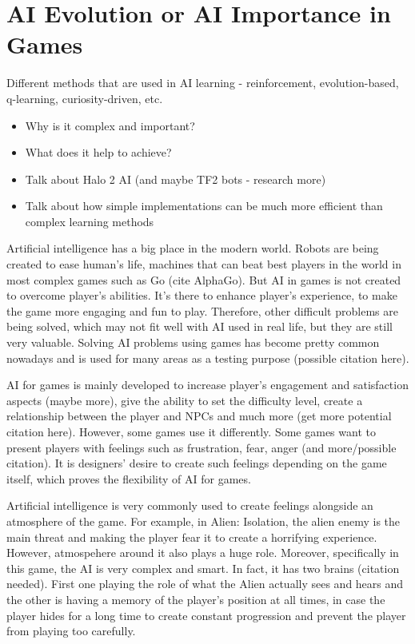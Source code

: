 \documentclass[journal]{IEEEtran}
\begin{document}
\section{AI Evolution or AI Importance in Games}
Different methods that are used in AI learning - reinforcement, evolution-based, q-learning, curiosity-driven, etc. 
\begin{itemize}
	\item Why is it complex and important?
	\item What does it help to achieve? 
	\item Talk about Halo 2 AI (and maybe TF2 bots - research more)
	\item Talk about how simple implementations can be much more efficient than complex learning methods
\end{itemize}

Artificial intelligence has a big place in the modern world. Robots are being created to ease human's life, machines that can beat best players in the world in most complex games such as Go (cite AlphaGo). But AI in games is not created to overcome player's abilities. It's there to enhance player's experience, to make the game more engaging and fun to play. Therefore, other difficult problems are being solved, which may not fit well with AI used in real life, but they are still very valuable. Solving AI problems using games has become pretty common nowadays and is used for many areas as a testing purpose (possible citation here).

AI for games is mainly developed to increase player's engagement and satisfaction aspects (maybe more), give the ability to set the difficulty level, create a relationship between the player and NPCs and much more (get more potential citation here). However, some games use it differently. Some games want to present players with feelings such as frustration, fear, anger (and more/possible citation). It is designers' desire to create such feelings depending on the game itself, which proves the flexibility of AI for games.

Artificial intelligence is very commonly used to create feelings alongside an atmosphere of the game. For example, in Alien: Isolation, the alien enemy is the main threat and making the player fear it to create a horrifying experience. However, atmospehere around it also plays a huge role. Moreover, specifically in this game, the AI is very complex and smart. In fact, it has two brains (citation needed). First one playing the role of what the Alien actually sees and hears and the other is having a memory of the player's position at all times, in case the player hides for a long time to create constant progression and prevent the player from playing too carefully.
\end{document}
